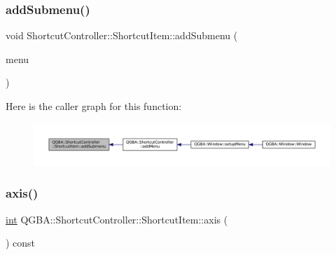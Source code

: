 \subsubsection{\texorpdfstring{add\+Submenu()}{addSubmenu()}}
{\footnotesize\ttfamily void Shortcut\+Controller\+::\+Shortcut\+Item\+::add\+Submenu (\begin{DoxyParamCaption}\item[{Q\+Menu $\ast$}]{menu }\end{DoxyParamCaption})}

Here is the caller graph for this function\+:
\nopagebreak
\begin{figure}[H]
\begin{center}
\leavevmode
\includegraphics[width=350pt]{class_q_g_b_a_1_1_shortcut_controller_1_1_shortcut_item_a0c8a572e52c50411436c115bfca4bd1d_icgraph}
\end{center}
\end{figure}
\mbox{\label{class_q_g_b_a_1_1_shortcut_controller_1_1_shortcut_item_ae2f1e9c1375d9fe588abb53e3d7f480f}} 
\subsubsection{\texorpdfstring{axis()}{axis()}}
{\footnotesize\ttfamily \mbox{\hyperlink{ioapi_8h_a787fa3cf048117ba7123753c1e74fcd6}{int}} Q\+G\+B\+A\+::\+Shortcut\+Controller\+::\+Shortcut\+Item\+::axis (\begin{DoxyParamCaption}{ }\end{DoxyParamCaption}) const\hspace{0.3cm}{\ttfamily [inline]}}


